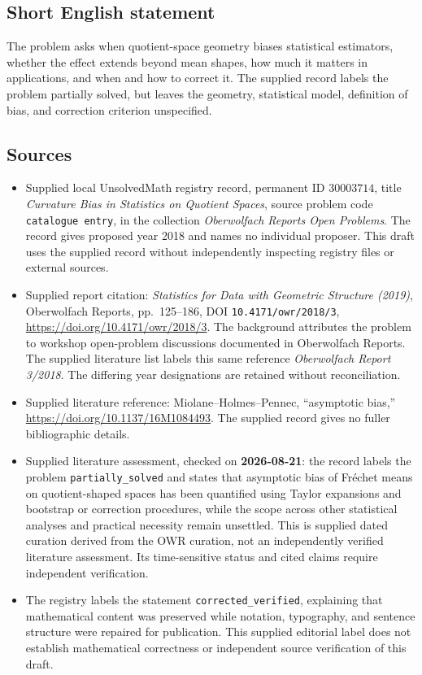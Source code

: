 \documentclass[11pt]{article}
\begin{document}
\subsection{Short English statement}
The problem asks when quotient-space geometry biases statistical estimators, whether the effect extends beyond mean shapes, how much it matters in applications, and when and how to correct it. The supplied record labels the problem partially solved, but leaves the geometry, statistical model, definition of bias, and correction criterion unspecified.
\subsection{Sources}
\begin{itemize}
\item Supplied local UnsolvedMath registry record, permanent ID \(30003714\), title \emph{Curvature Bias in Statistics on Quotient Spaces}, source problem code \texttt{catalogue entry}, in the collection \emph{Oberwolfach Reports Open Problems}. The record gives proposed year 2018 and names no individual proposer. This draft uses the supplied record without independently inspecting registry files or external sources.
\item Supplied report citation: \emph{Statistics for Data with Geometric Structure (2019)}, Oberwolfach Reports, pp.\ 125--186, DOI \texttt{10.4171/owr/2018/3}, \url{https://doi.org/10.4171/owr/2018/3}. The background attributes the problem to workshop open-problem discussions documented in Oberwolfach Reports. The supplied literature list labels this same reference \emph{Oberwolfach Report 3/2018}. The differing year designations are retained without reconciliation.
\item Supplied literature reference: Miolane--Holmes--Pennec, ``asymptotic bias,'' \url{https://doi.org/10.1137/16M1084493}. The supplied record gives no fuller bibliographic details.
\item Supplied literature assessment, checked on \textbf{2026-08-21}: the record labels the problem \texttt{partially\_solved} and states that asymptotic bias of Fr\'echet means on quotient-shaped spaces has been quantified using Taylor expansions and bootstrap or correction procedures, while the scope across other statistical analyses and practical necessity remain unsettled. This is supplied dated curation derived from the OWR curation, not an independently verified literature assessment. Its time-sensitive status and cited claims require independent verification.
\item The registry labels the statement \texttt{corrected\_verified}, explaining that mathematical content was preserved while notation, typography, and sentence structure were repaired for publication. This supplied editorial label does not establish mathematical correctness or independent source verification of this draft.
\end{itemize}
\end{document}
